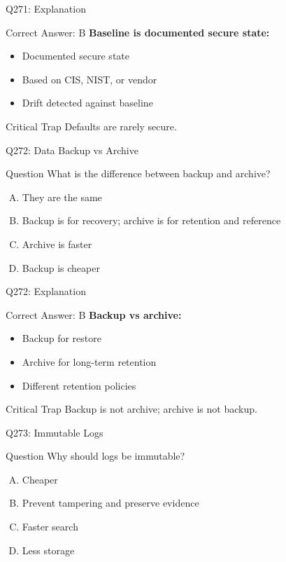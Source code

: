 \documentclass{beamer}
\begin{document}
	\begin{frame}{Q271: Explanation}
		\begin{block}{Correct Answer: B}
			\textbf{Baseline is documented secure state:}
			\begin{itemize}
				\item Documented secure state
				\item Based on CIS, NIST, or vendor
				\item Drift detected against baseline
			\end{itemize}
		\end{block}
		\begin{alertblock}{Critical Trap}
			Defaults are rarely secure.
		\end{alertblock}
	\end{frame}
	
	\begin{frame}{Q272: Data Backup vs Archive}
		\begin{block}{Question}
			What is the difference between backup and archive?
		\end{block}
		\begin{enumerate}[(A)]
			\item They are the same
			\item Backup is for recovery; archive is for retention and reference
			\item Archive is faster
			\item Backup is cheaper
		\end{enumerate}
	\end{frame}
	
	\begin{frame}{Q272: Explanation}
		\begin{block}{Correct Answer: B}
			\textbf{Backup vs archive:}
			\begin{itemize}
				\item Backup for restore
				\item Archive for long-term retention
				\item Different retention policies
			\end{itemize}
		\end{block}
		\begin{alertblock}{Critical Trap}
			Backup is not archive; archive is not backup.
		\end{alertblock}
	\end{frame}
	
	\begin{frame}{Q273: Immutable Logs}
		\begin{block}{Question}
			Why should logs be immutable?
		\end{block}
		\begin{enumerate}[(A)]
			\item Cheaper
			\item Prevent tampering and preserve evidence
			\item Faster search
			\item Less storage
		\end{enumerate}
	\end{frame}
	
\end{document}

